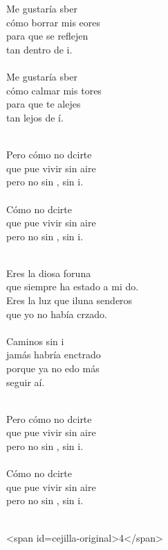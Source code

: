 \begin{cancion}
\jump\\
	    \\
	Me gustaría sber \\
	cómo borrar mis eores\\
	para que  se reflejen \\
	tan dentro de i.\\
\jump\\
	Me gustaría sber \\
	cómo calmar mis tores\\
	para que  te alejes\\
	tan lejos de í.\\\jump\\
	\begin{chorus}%
	Pero cómo no dcirte\\
	que pue vivir sin aire\\
	pero no sin , sin i.\\
\jump\\
	Cómo no dcirte\\
	que pue vivir sin aire\\
	pero no sin , sin i.\\
	\end{chorus}%
	\jump\\
	Eres la diosa foruna\\
	que siempre ha estado a mi do.\\
	Eres la luz que iluna senderos\\
	que yo no había crzado.\\
\jump\\
	Caminos sin i \\
	jamás habría enctrado\\
	porque ya no edo más\\
	seguir aí.\\\jump\\
	\begin{chorus}%
	Pero cómo no dcirte\\
	que pue vivir sin aire\\
	pero no sin , sin i.\\
\jump\\
	Cómo no dcirte\\
	que pue vivir sin aire\\
	pero no sin , sin i.\\
	\end{chorus}%
	\jump\\
<span id=cejilla-original>4</span>\\
\end{cancion}%
